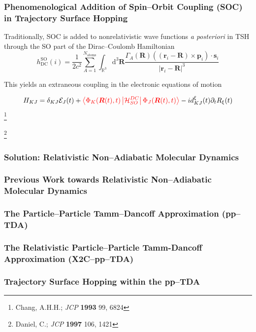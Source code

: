 \documentclass[usepdftitle=false,10pt]{beamer}
\newcommand{\innerop}[3]{\left\langle #1 \left\vert #2 \right\vert #3 \right\rangle}  %
\newcommand*\vc[1]{\boldsymbol{#1}}
\newcommand\blfootnote[1]{%
  \begingroup
  \renewcommand\thefootnote{}\footnote{#1}%
  \addtocounter{footnote}{-1}%
  \endgroup
}
\begin{document}
\begin{frame}
  \frametitle{Phenomenological Addition of Spin--Orbit Coupling (SOC) in
  Trajectory Surface Hopping}

  Traditionally, SOC is added to nonrelativistic wave functions 
  \emph{a posteriori} in TSH through the SO part of the Dirac--Coulomb
  Hamiltonian
  \begin{equation*}
    h_\mathrm{DC}^\mathrm{SO} (i) = \frac{1}{2c^2} \sum_{A=1}^{N_\mathrm{atoms}}
      \int_{\mathbb{R}^3}\mathrm{d}^3\vc{R}
      \frac{\Gamma_A(\vc{R})
        (( \vc{r}_i - \vc{R} ) \times \vc{p}_i)\cdot \vc{s}_i}
	{\vert \vc{r}_i - \vc{R} \vert^3}
  \end{equation*}

  This yields an extraneous coupling in the electronic equations of motion

  \begin{equation*}
    H_{KJ} = \delta_{KJ}\mathcal{E}_J(t) +
    {\color{red}
      \innerop{\Phi_K(\vc{R}(t),t)}{\mathcal{H}_{SO}^{DC}}{\Phi_J(\vc{R}(t),t)}
    }
    - i d_{KJ}^\xi (t) \partial_t R_{\xi}(t) 
  \end{equation*}
  \blfootnote{\tiny Chang, A.H.H.; \emph{JCP} \textbf{1993} 99, 6824}
  \blfootnote{\tiny Daniel, C.; \emph{JCP} \textbf{1997} 106, 1421}
\end{frame}


\begin{frame}
  \frametitle{Solution: Relativistic Non--Adiabatic Molecular Dynamics}
\end{frame}


\begin{frame}
  \frametitle{Previous Work towards Relativistic Non--Adiabatic Molecular Dynamics}
\end{frame}

\begin{frame}
  \frametitle{The Particle--Particle Tamm--Dancoff Approximation (pp--TDA)}
\end{frame}

\begin{frame}
  \frametitle{The Relativistic Particle--Particle Tamm-Dancoff Approximation 
  (X2C--pp--TDA)}
\end{frame}

\begin{frame}
  \frametitle{Trajectory Surface Hopping within the pp--TDA}
\end{frame}
\end{document}
